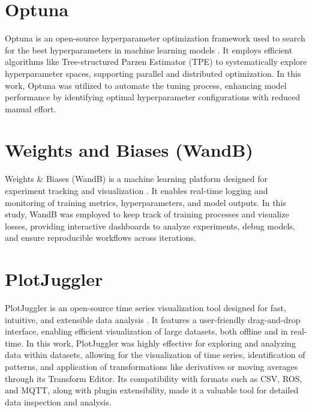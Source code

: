 \section{Optuna}
Optuna is an open-source hyperparameter optimization framework used to search for the best hyperparameters in machine learning models \cite{akiba_optuna_2019}. It employs efficient algorithms like Tree-structured Parzen Estimator (TPE) to systematically explore hyperparameter spaces, supporting parallel and distributed optimization. In this work, Optuna was utilized to automate the tuning process, enhancing model performance by identifying optimal hyperparameter configurations with reduced manual effort.

\section{Weights and Biases (WandB)}
Weights \& Biases (WandB) is a machine learning platform designed for experiment tracking and visualization \cite{noauthor_weights_nodate}. It enables real-time logging and monitoring of training metrics, hyperparameters, and model outputs. In this study, WandB was employed to keep track of training processes and visualize losses, providing interactive dashboards to analyze experiments, debug models, and ensure reproducible workflows across iterations.

\section{PlotJuggler}
PlotJuggler is an open-source time series visualization tool designed for fast, intuitive, and extensible data analysis \cite{faconti_facontidavideplotjuggler_2025}. It features a user-friendly drag-and-drop interface, enabling efficient visualization of large datasets, both offline and in real-time. In this work, PlotJuggler was highly effective for exploring and analyzing data within datasets, allowing for the visualization of time series, identification of patterns, and application of transformations like derivatives or moving averages through its Transform Editor. Its compatibility with formats such as CSV, ROS, and MQTT, along with plugin extensibility, made it a valuable tool for detailed data inspection and analysis.

